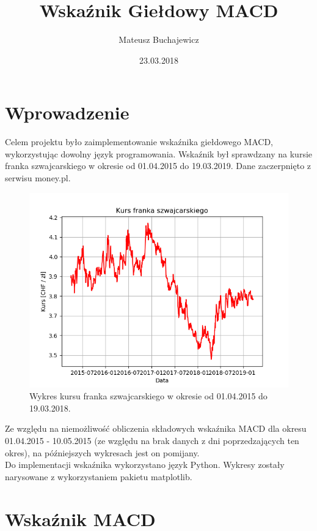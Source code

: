 \documentclass{article} %
\title{Wskaźnik Giełdowy MACD}
\date{23.03.2018}
\author{Mateusz Buchajewicz}
\begin{document}
\maketitle
\section{Wprowadzenie}
Celem projektu było zaimplementowanie wskaźnika giełdowego MACD, wykorzystując dowolny język programowania.
Wskaźnik był sprawdzany na kursie franka szwajcarskiego w okresie od 01.04.2015 do 19.03.2019. 
Dane zaczerpnięto z serwisu money.pl. \\

\begin{figure}[h]
    \centering
    \includegraphics[scale=0.7]{wykres_kursu}
    \caption{Wykres kursu franka szwajcarskiego w okresie od 01.04.2015 do 19.03.2018.}
\end{figure} 

Ze względu na niemożliwość obliczenia składowych wskaźnika MACD dla okresu 01.04.2015 - 10.05.2015
(ze względu na brak danych z dni poprzedzających ten okres), na późniejszych wykresach jest on pomijany. \\

Do implementacji wskaźnika wykorzystano język Python. Wykresy zostały narysowane z wykorzystaniem pakietu matplotlib.




\newpage

\section{Wskaźnik MACD}
\end{document}
